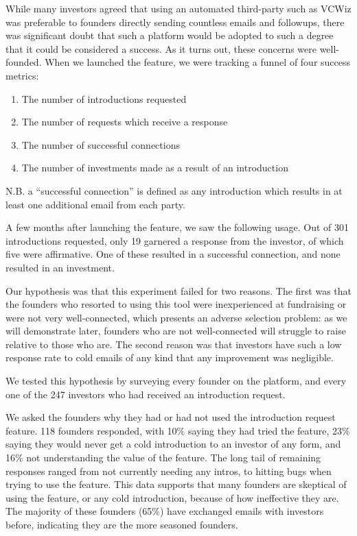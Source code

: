 While many investors agreed that using an automated third-party such as VCWiz was preferable to founders directly sending countless emails and followups, there was significant doubt that such a platform would be adopted to such a degree that it could be considered a success. As it turns out, these concerns were well-founded. When we launched the feature, we were tracking a funnel of four success metrics:

\begin{enumerate}
  \item The number of introductions requested
  \item The number of requests which receive a response
  \item The number of successful connections
  \item The number of investments made as a result of an introduction
\end{enumerate}

N.B. a ``successful connection'' is defined as any introduction which results in at least one additional email from each party.

A few months after launching the feature, we saw the following usage. Out of 301 introductions requested, only 19 garnered a response from the investor, of which five were affirmative. One of these resulted in a successful connection, and none resulted in an investment.

Our hypothesis was that this experiment failed for two reasons. The first was that the founders who resorted to using this tool were inexperienced at fundraising or were not very well-connected, which presents an adverse selection problem: as we will demonstrate later, founders who are not well-connected will struggle to raise relative to those who are. The second reason was that investors have such a low response rate to cold emails of any kind that any improvement was negligible.

We tested this hypothesis by surveying every founder on the platform, and every one of the 247 investors who had received an introduction request.

We asked the founders why they had or had not used the introduction request feature. 118 founders responded, with 10\% saying they had tried the feature, 23\% saying they would never get a cold introduction to an investor of any form, and 16\% not understanding the value of the feature. The long tail of remaining responses ranged from not currently needing any intros, to hitting bugs when trying to use the feature. This data supports that many founders are skeptical of using the feature, or any cold introduction, because of how ineffective they are. The majority of these founders (65\%) have exchanged emails with investors before, indicating they are the more seasoned founders.

